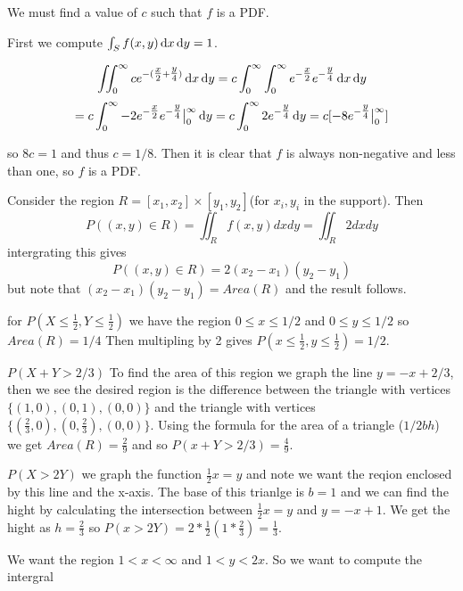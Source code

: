 \documentclass[11pt,largemargins]{homework}
\begin{document}
\maketitle

\question
We must find a value of $c$ such that $f$ is a PDF. 

First we compute $\int_S f(x, y) \dif x \dif y = 1$. 

\[\iint_0^\infty ce^{-(\tfrac{x}{2} + \tfrac{y}{4})} \dif x \dif y = c \int_0^\infty \int_0^\infty e^{-\tfrac{x}{2}}e^{-\tfrac{y}{4}} \dif x \dif y\] 
\[= c \int_0^\infty -2e^{-\tfrac{x}{2}}e^{-\tfrac{y}{4}} \big|_0^\infty \dif y = c \int_0^\infty 2e^{-\tfrac{y}{4}} \dif y= c[-8e^{-\tfrac{y}{4}} \big|_0^\infty]  \]

so $8c = 1$ and thus $c = 1/8$. Then it is clear that $f$ is always non-negative and less than one, so $f$ is a PDF. 
\newpage
\question

\begin{alphaparts}
\questionpart 
Consider the region $R = [x_1, x_2] \times [y_1, y_2]$(for $x_i, y_i$ in the support). Then 
\[P((x, y) \in R) = \iint_R f(x, y) dxdy = \iint_R 2 dxdy \] 
intergrating this gives 
\[ P((x, y) \in R) = 2(x_2 - x_1)(y_2 - y_1) \] 
but note that $(x_2 - x_1)(y_2 - y_1) = Area(R)$ and the result follows. 

\questionpart 
for $P(X \leq \tfrac{1}{2}, Y \leq \tfrac{1}{2})$ we have the region $ 0 \leq x \leq 1/2$ and $0 \leq y \leq 1/2$ so $Area(R) = 1/4$ 
Then multipling by 2 gives $P(x \leq \tfrac{1}{2}, y \leq \tfrac{1}{2}) = 1/2$. 

\questionpart 
$P(X + Y > 2/3)$ To find the area of this region we graph the line $y = -x + 2/3$, then we see the desired region is the difference between the 
triangle with vertices $\{(1,0), (0, 1), (0, 0)\}$ and the triangle with vertices $\{(\tfrac{2}{3},0), (0, \tfrac{2}{3}), (0, 0)\}$. Using the formula 
for the area of a triangle ($1/2bh$) we get $Area(R) = \frac{2}{9}$ and so $P(x + Y > 2/3)  = \frac{4}{9}$. 

\questionpart 
$P(X > 2Y)$ we graph the function $\frac{1}{2}x = y$ and note we want the reqion enclosed by this line and the x-axis. The base of 
this trianlge is $b = 1$ and we can find the hight by calculating the intersection between $\frac{1}{2}x = y$ and $y = -x + 1$. We get the 
hight as $h = \frac{2}{3}$ so $P(x > 2Y) = 2 * \frac{1}{2}(1 * \frac{2}{3}) = \frac{1}{3}$. 


    
\end{alphaparts}
\newpage
\question 
We want the region $1 < x < \infty$ and $1 < y < 2x$. So we want to compute the intergral 
\end{document}
